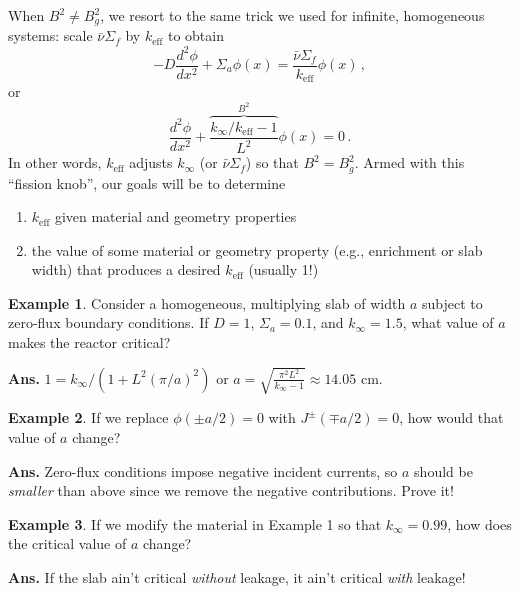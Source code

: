 \documentclass[compact]{ne630handout}
\begin{document}
\begin{handoutflow}
When $B^2 \neq B_g^2$, we resort to the same trick we used
for infinite, homogeneous systems: scale $\bar{\nu}\Sigma_f$ by $k_{\text{eff}}$ to obtain
\begin{equation*}
  -D \frac{d^2 \phi}{dx^2} + \Sigma_a \phi(x) = \frac{\bar{\nu}\Sigma_f}{k_{\text{eff}}} \phi(x) \, ,
\end{equation*}
or
\begin{equation*}
  \frac{d^2 \phi}{dx^2} + \overbrace{\frac{k_{\infty}/k_{\text{eff}} -1}{L^2}}^{B^2} \phi(x) = 0 \, .
\end{equation*}
In other words, $k_{\text{eff}}$ adjusts $k_{\infty}$ (or $\bar{\nu}\Sigma_f$) so that $B^2 = B^2_g$.
Armed with this ``fission knob'', our goals will be to determine
\begin{enumerate}
 \item $k_{\text{eff}}$ given material and geometry properties
 \item the value of some material or geometry property (e.g., enrichment or slab width) that produces a desired $k_{\text{eff}}$ (usually 1!)
\end{enumerate}

{\bf Example 1}. Consider a homogeneous, multiplying slab of width $a$ subject to zero-flux
boundary conditions.  If $D=1$, $\Sigma_a = 0.1$, and $k_{\infty} = 1.5$,
what value of $a$ makes the reactor critical?

{ \textcolor{wcprimary}{ {\bf Ans.}  $1 = k_{\infty}/(1+L^2 (\pi/a)^2)$ or
$a = \sqrt{\frac{\pi^2 L^2}{k_{\infty}-1}} \approx 14.05$ cm.
}}

{\bf Example 2}.  If we replace $\phi(\pm a/2) = 0$ with $J^{\pm}(\mp a/2) = 0$, how
would that value of $a$ change?

{ \textcolor{wcprimary}{ {\bf Ans.}  Zero-flux conditions impose negative incident currents, so $a$ should be {\it smaller} than above since we remove the negative contributions.  Prove it!
}}

{\bf Example 3}.  If we modify the material in Example 1 so that $k_{\infty} = 0.99$, how does
the critical value of $a$ change?

{ \textcolor{wcprimary}{ {\bf Ans.}  If the slab ain't critical {\it without} leakage, it ain't critical {\it with} leakage!
}}

\end{handoutflow}
\end{document}
